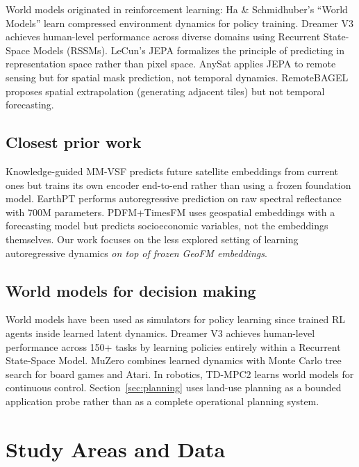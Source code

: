 \documentclass{article}
\begin{document}
World models originated in reinforcement learning: Ha \& Schmidhuber's ``World Models'' \citep{ha2018world} learn compressed environment dynamics for policy training. Dreamer V3 \citep{hafner2023dreamerv3} achieves human-level performance across diverse domains using Recurrent State-Space Models (RSSMs). LeCun's JEPA \citep{lecun2022jepa} formalizes the principle of predicting in representation space rather than pixel space. AnySat \citep{astruc2024anysat} applies JEPA to remote sensing but for spatial mask prediction, not temporal dynamics. RemoteBAGEL \citep{remotebagel2025} proposes spatial extrapolation (generating adjacent tiles) but not temporal forecasting.

\subsection{Closest prior work}

Knowledge-guided MM-VSF \citep{mmvsf2024} predicts future satellite embeddings from current ones but trains its own encoder end-to-end rather than using a frozen foundation model. EarthPT \citep{smith2023earthpt} performs autoregressive prediction on raw spectral reflectance with 700M parameters. PDFM+TimesFM \citep{google2024pdfm} uses geospatial embeddings with a forecasting model but predicts socioeconomic variables, not the embeddings themselves. Our work focuses on the less explored setting of learning autoregressive dynamics \textit{on top of frozen GeoFM embeddings}.

\subsection{World models for decision making}

World models have been used as simulators for policy learning since \citet{ha2018world} trained RL agents inside learned latent dynamics. Dreamer V3 \citep{hafner2023dreamerv3} achieves human-level performance across 150+ tasks by learning policies entirely within a Recurrent State-Space Model. MuZero \citep{schrittwieser2020muzero} combines learned dynamics with Monte Carlo tree search for board games and Atari. In robotics, TD-MPC2 \citep{hansen2024tdmpc2} learns world models for continuous control. Section~\ref{sec:planning} uses land-use planning as a bounded application probe rather than as a complete operational planning system.


\section{Study Areas and Data}
\label{sec:data}
\end{document}
